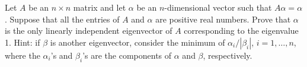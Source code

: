 Let $A$ be an $n \times n$ matrix and let $\alpha$ be an $n$-dimensional vector
such that $A\alpha = \alpha$. Suppose that all the entries of $A$ and $\alpha$
are positive real numbers. Prove that $\alpha$ is the only linearly independent
eigenvector of $A$ corresponding to the eigenvalue 1. Hint: if $\beta$ is
another eigenvector, consider the minimum of $\alpha_i /|\beta_i|$, $i = 1,
\dots, n$, where the $\alpha_i$'s and $\beta_i$'s are the components of
$\alpha$ and $\beta$, respectively.
